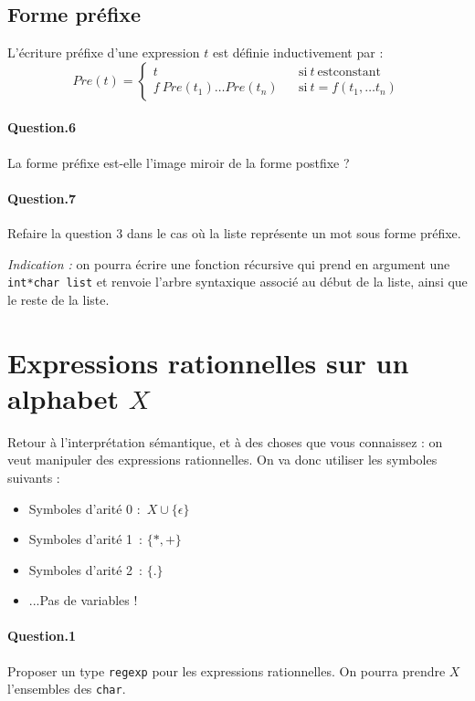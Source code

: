 \documentclass[10pt,a4paper]{article}
\theoremstyle{definition}
\begin{document}
\subsection{Forme préfixe}
L'écriture préfixe d'une expression $t$ est définie inductivement par :
\[Pre(t)=\left\lbrace
\begin{array}{lcl}
t & & \mathrm{si} \ t \ \mathrm{est constant}\\
f \ Pre(t_1)\dots Pre(t_n) & & \mathrm{si} \ t = f(t_1,\dots t_n)
\end{array}\right.\]

\paragraph{Question.6} La forme préfixe est-elle l'image miroir de la forme 
postfixe ?

\paragraph{Question.7} Refaire la question 3 dans le cas où la liste représente
un mot sous forme préfixe.

\textit{Indication :} on pourra écrire une fonction récursive qui prend en 
argument une \texttt{int*char list} et renvoie l'arbre syntaxique associé au 
début de la liste, ainsi que le reste de la liste.

\section{Expressions rationnelles sur un alphabet $X$}
Retour à l'interprétation sémantique, et à des choses que vous connaissez : on 
veut manipuler des expressions rationnelles. On va donc utiliser les symboles 
suivants :
\begin{itemize}
\item Symboles d'arité 0 : $X \cup \{ \epsilon \}$
\item Symboles d'arité 1 : $\{ *, + \} $
\item Symboles d'arité 2 : $\{ .\} $
\item ...Pas de variables !
\end{itemize}

\paragraph{Question.1} Proposer un type \texttt{regexp} pour les expressions 
rationnelles. On pourra prendre $X$ l'ensembles des \texttt{char}.
\end{document}
